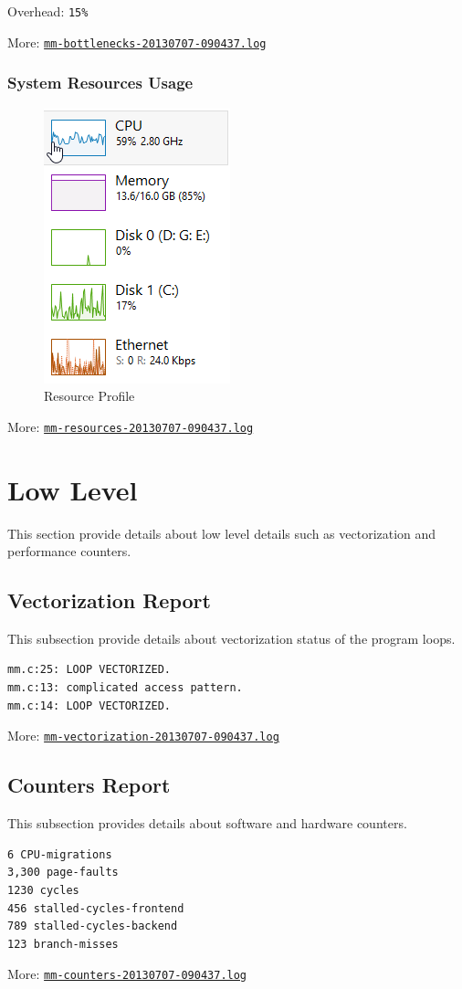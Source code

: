 \documentclass[a4paper]{article}
\begin{document}
Overhead: {\tt 15\%}

More: \href{TBD}{\tt mm-bottlenecks-20130707-090437.log}

\subsubsection{System Resources Usage}

\begin{figure}[H]
\label{fig:resources}
\centering
\includegraphics{resources.png}
\caption{Resource Profile}
\end{figure}

More: \href{TBD}{\tt mm-resources-20130707-090437.log}

\section{Low Level}

This section provide details about low level details such as vectorization and performance counters.

\subsection{Vectorization Report}

This subsection provide details about vectorization status of the program loops.

\begin{verbatim}
mm.c:25: LOOP VECTORIZED.
mm.c:13: complicated access pattern.
mm.c:14: LOOP VECTORIZED.
\end{verbatim}

More: \href{TBD}{\tt mm-vectorization-20130707-090437.log}

\subsection{Counters Report}

This subsection provides details about software and hardware counters.

\begin{verbatim}
6 CPU-migrations
3,300 page-faults
1230 cycles
456 stalled-cycles-frontend
789 stalled-cycles-backend
123 branch-misses
\end{verbatim}

More: \href{TBD}{\tt mm-counters-20130707-090437.log}
\end{document}
